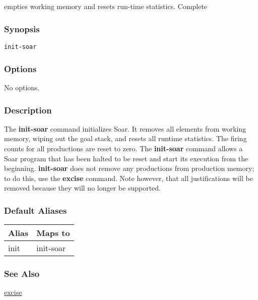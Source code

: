 \subsection{}
\label{init-soar}
empties working memory and resets run-time statistics. 
 Complete
\subsubsection*{Synopsis}
\begin{verbatim}
init-soar
\end{verbatim}
\subsubsection*{Options}
 No options. 
\subsubsection*{Description}
 The \textbf{init-soar}
 command initializes Soar. It removes all elements from working memory, wiping out the goal stack, and resets all runtime statistics. The firing counts for all productions are reset to zero. The \textbf{init-soar}
 command allows a Soar program that has been halted to be reset and start its execution from the beginning. 
 \textbf{init-soar}
 does not remove any productions from production memory; to do this, use the \textbf{excise}
 command. Note however, that all justifications will be removed because they will no longer be supported. 
\subsubsection*{Default Aliases}
\begin{tabular}{|l|l|}
\hline 
 Alias  & Maps to  \\
 \hline 
 init  & init-soar  \\
 \hline 
\end{tabular}
\subsubsection*{See Also}
\hyperref[excise]{excise} 